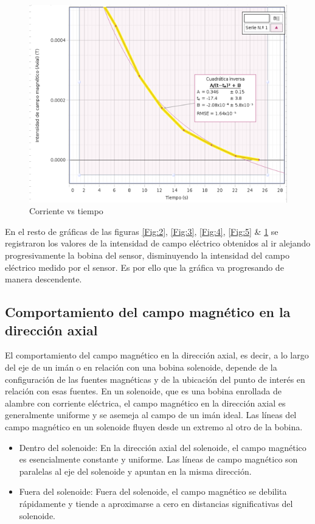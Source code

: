 \documentclass{article}
\begin{document}
\begin{figure}[H]
   \centering
   \includegraphics[scale=0.4]{../imgs/a5.png}
   \caption{Corriente vs tiempo}
   \label{Fig:6}
\end{figure}

En el resto de gráficas de las figuras \ref{Fig:2}, \ref{Fig:3}, \ref{Fig:4}, \ref{Fig:5} \& \ref{Fig:6} se registraron los valores de la intensidad de campo eléctrico obtenidos al ir alejando progresivamente la bobina del sensor, disminuyendo la intensidad del campo eléctrico medido por el sensor. Es por ello que la gráfica va progresando de manera descendente. 

\subsection*{Comportamiento del campo magnético en la dirección axial}

El comportamiento del campo magnético en la dirección axial, es decir, a lo largo del eje de un imán o en relación con una bobina solenoide, depende de la configuración de las fuentes magnéticas y de la ubicación del punto de interés en relación con esas fuentes. En un solenoide, que es una bobina enrollada de alambre con corriente eléctrica, el campo magnético en la dirección axial es generalmente uniforme y se asemeja al campo de un imán ideal. Las líneas del campo magnético en un solenoide fluyen desde un extremo al otro de la bobina.

\begin{itemize}
\item Dentro del solenoide: En la dirección axial del solenoide, el campo magnético es esencialmente constante y uniforme. Las líneas de campo magnético son paralelas al eje del solenoide y apuntan en la misma dirección.
\item Fuera del solenoide: Fuera del solenoide, el campo magnético se debilita rápidamente y tiende a aproximarse a cero en distancias significativas del solenoide.
\end{itemize}
\end{document}
